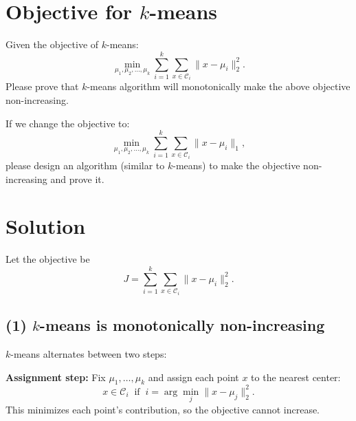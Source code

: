 \documentclass[11pt]{article}
\newcommand{\R}{\mathbb{R}}
\newcommand{\mtx}[1]{\mathbf{#1}}
\newcommand{\vct}[1]{\mathbf{#1}}
\def \mA {\mtx{A}}
\def \mZ {\mtx{Z}}
\def \vx {\vct{x}}
\def \vy {\vct{y}}
\def \R {\mathbb{R}}
\begin{document}
\newpage
 \section*{Objective for $k$-means}
 Given the objective of $k$-means:
 \begin{equation}
 	\min\limits_{\mu_1,\mu_2,\dots,\mu_k}\sum_{i=1}^k\sum_{x\in\mathcal{C}_i}\|x-\mu_i\|^2_2.
 \end{equation}
Please prove that $k$-means algorithm will monotonically make the above objective non-increasing.


\vspace{.2cm}
\noindent If we change the objective to:
 \begin{equation}
	\min\limits_{\mu_1,\mu_2,\dots,\mu_k}\sum_{i=1}^k\sum_{x\in\mathcal{C}_i}\|x-\mu_i\|_1,
\end{equation}
please design an algorithm (similar to $k$-means) to make the objective non-increasing and prove it. 

\section*{Solution}

Let the objective be
\[
J = \sum_{i=1}^k \sum_{x \in \mathcal{C}_i} \|x - \mu_i\|_2^2.
\]

\subsection*{(1) $k$-means is monotonically non-increasing}

$k$-means alternates between two steps:

\textbf{Assignment step:}  
Fix $\mu_1,\dots,\mu_k$ and assign each point $x$ to the nearest center:
\[
x \in \mathcal{C}_i \;\; \text{if} \;\; i = \arg\min_j \|x - \mu_j\|_2^2.
\]
This minimizes each point’s contribution, so the objective cannot increase.
\end{document}
